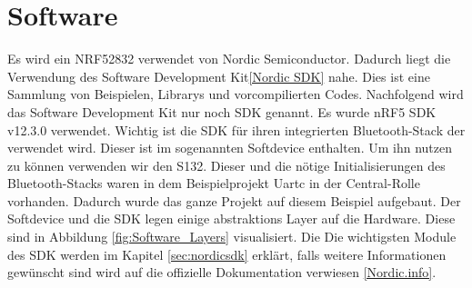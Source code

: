 \section{Software}\label{sec:software}


Es wird ein NRF52832 verwendet von Nordic Semiconductor. Dadurch liegt die Verwendung des Software Development Kit\ref{Nordic SDK} nahe. Dies ist eine Sammlung von Beispielen, Librarys und vorcompilierten Codes. Nachfolgend wird das Software Development Kit nur noch SDK genannt. Es wurde nRF5 SDK v12.3.0 verwendet. Wichtig ist die SDK für ihren integrierten Bluetooth-Stack der verwendet wird. Dieser ist im sogenannten Softdevice enthalten. Um ihn nutzen zu können verwenden wir den S132. Dieser und die nötige Initialisierungen des Bluetooth-Stacks waren in dem Beispielprojekt Uartc in der Central-Rolle vorhanden. Dadurch wurde das ganze Projekt auf diesem Beispiel aufgebaut. Der Softdevice und die SDK legen einige abstraktions Layer auf die Hardware. Diese sind in Abbildung \ref{fig:Software_Layers} visualisiert. Die Die wichtigsten Module des SDK werden im Kapitel \ref{sec:nordicsdk} erklärt, falls weitere Informationen gewünscht sind wird auf die offizielle Dokumentation verwiesen \ref{Nordic.info}.



